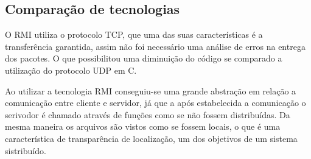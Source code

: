 \documentclass[10pt,a4paper]{article}
\begin{document}
\begin{center}
  \begin{table}[h!]
    \begin{centering}
      \par\end{centering}
    \caption{Ver compromissos do mês}
  \end{table}
  \par\end{center}
\newpage

\subsection{Comparação de tecnologias}
O RMI utiliza o protocolo TCP, que uma das suas características é 
a transferência garantida, assim não foi necessário uma análise de erros na entrega
dos pacotes. O que possibilitou uma diminuição do código se comparado
a utilização do protocolo UDP em C.

Ao utilizar a tecnologia RMI conseguiu-se uma grande abstração em relação a
comunicação entre cliente e servidor, já que a após estabelecida a comunicação o serivodor
é chamado através de funções como se não fossem distribuídas. Da mesma maneira os arquivos são vistos como se fossem locais,
o que é uma característica de transparência de localização, um dos objetivos de um sistema sistribuído. 
\end{document}
